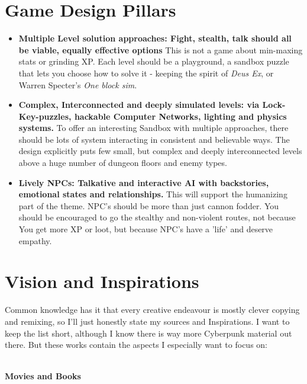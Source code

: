 \documentclass[11pt,a4paper]{article}
\begin{document}
\section{Game Design Pillars}
\begin{itemize}
    \item \textbf{Multiple Level solution approaches:
        Fight, stealth, talk should all be viable, equally effective options}
        This is not a game about min-maxing stats or grinding XP. Each level should be a
        playground, a sandbox puzzle that lets you choose how to solve it - keeping the spirit
        of \textit{Deus Ex}, or Warren Specter's \textit{One block sim}.

    \item \textbf{Complex, Interconnected and deeply simulated levels:
        via Lock-Key-puzzles, hackable Computer Networks, lighting and physics systems.}
        To offer an interesting Sandbox with multiple approaches, there should be lots of system
        interacting in consistent and believable ways. The design explicitly puts few small, but
        complex and deeply interconnected levels above a huge number of dungeon floors and enemy
        types.

    \item \textbf{Lively NPCs:
        Talkative and interactive AI with backstories, emotional states and relationships.}
        This will support the humanizing part of the theme. NPC's should be more than just cannon
        fodder. You should be encouraged to go the stealthy and non-violent routes, not because You
        get more XP or loot, but because NPC's have a 'life' and deserve empathy.
\end{itemize}

\section{Vision and Inspirations}
Common knowledge has it that every creative endeavour is mostly clever copying and remixing, so I'll
just honestly state my sources and Inspirations. I want to keep the list short, although I know there
is way more Cyberpunk material out there. But these works contain the aspects I especially want to
focus on:\\ \

\textbf{Movies and Books}
\end{document}
